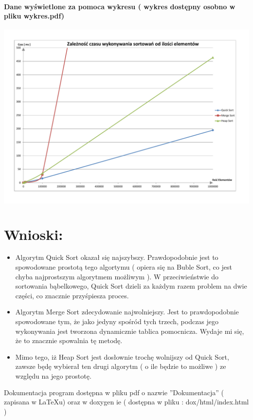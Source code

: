 \documentclass[10 pt]{article}
\begin{document}
\paragraph{Dane wyświetlone za pomoca wykresu ( wykres dostępny osobno w pliku wykres.pdf) \\}
\begin{center}
\includegraphics[scale=0.4]{wykres.pdf}
\end{center}
\section{Wnioski:}
\begin{itemize}
\item Algorytm Quick Sort okazał się najszybszy. Prawdopodobnie jest to spowodowane prostotą tego algortymu (
opiera się na Buble Sort, co jest chyba najprostszym algorytmem możliwym ). W przeciwieństwie do
sortowania bąbelkowego, Quick Sort dzieli za każdym razem problem na dwie części, co znacznie przyśpiesza
proces.
\item Algorytm Merge Sort zdecydowanie najwolniejszy. Jest to prawdopodobnie spowodowane tym, że jako
jedyny spośród tych trzech, podczas jego wykonywania jest tworzona dynamicznie tablica pomocnicza.
Wydaje mi się, że to znacznie spowalnia tę metodę.
\item Mimo tego, iż Heap Sort jest dosłownie trochę wolnijszy od Quick Sort, zawsze będę wybierał ten drugi
algorytm ( o ile będzie to możliwe ) ze względu na jego prostotę.

\end{itemize}

Dokumentacja program dostępna w pliku pdf o nazwie ''Dokumentacja'' ( zapisana w \LaTeX u) oraz w doxygen ie ( dostępna w
pliku : dox/html/index.html )
\end{document}
